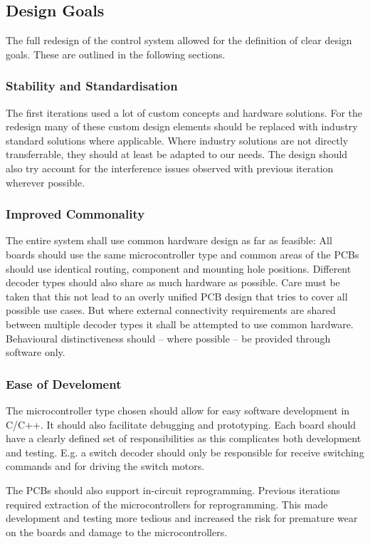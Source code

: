 \documentclass{scrreprt}
\begin{document}
\subsection{Design Goals}
The full redesign of the control system allowed for the definition of clear design goals. These are outlined in the following sections.

\subsubsection{Stability and Standardisation}
The first iterations used a lot of custom concepts and hardware solutions.
For the redesign many of these custom design elements should be replaced with industry standard solutions where applicable.
Where industry solutions are not directly transferrable, they should at least be adapted to our needs.
The design should also try account for the interference issues observed with previous iteration wherever possible.

\subsubsection{Improved Commonality}
The entire system shall use common hardware design as far as feasible:
All boards should use the same microcontroller type and common areas of the PCBs should use identical routing, component and mounting hole positions.
Different decoder types should also share as much hardware as possible.
Care must be taken that this not lead to an overly unified PCB design that tries to cover all possible use cases.
But where external connectivity requirements are shared between multiple decoder types it shall be attempted to use common hardware.
Behavioural distinctiveness should -- where possible -- be provided through software only.

\subsubsection{Ease of Develoment}
The microcontroller type chosen should allow for easy software development in C/C++.
It should also facilitate debugging and prototyping.
Each board should have a clearly defined set of responsibilities as this complicates both development and testing.
E.g. a switch decoder should only be responsible for receive switching commands and for driving the switch motors.

The PCBs should also support in-circuit reprogramming.
Previous iterations required extraction of the microcontrollers for reprogramming.
This made development and testing more tedious and increased the risk for premature wear on the boards and damage to the microcontrollers.
\end{document}

